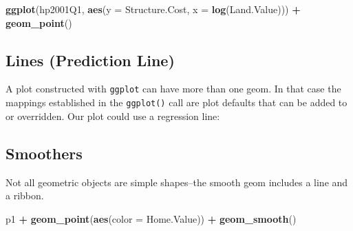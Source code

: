 \documentclass[]{book}
\newenvironment{Shaded}{\begin{snugshade}}{\end{snugshade}}
\newcommand{\KeywordTok}[1]{\textcolor[rgb]{0.13,0.29,0.53}{\textbf{#1}}}
\newcommand{\DataTypeTok}[1]{\textcolor[rgb]{0.13,0.29,0.53}{#1}}
\newcommand{\StringTok}[1]{\textcolor[rgb]{0.31,0.60,0.02}{#1}}
\newcommand{\OperatorTok}[1]{\textcolor[rgb]{0.81,0.36,0.00}{\textbf{#1}}}
\newcommand{\NormalTok}[1]{#1}
\begin{document}
\begin{Shaded}
\begin{Highlighting}[]
\KeywordTok{ggplot}\NormalTok{(hp2001Q1,}
       \KeywordTok{aes}\NormalTok{(}\DataTypeTok{y =}\NormalTok{ Structure.Cost, }\DataTypeTok{x =} \KeywordTok{log}\NormalTok{(Land.Value))) }\OperatorTok{+}
\StringTok{  }\KeywordTok{geom_point}\NormalTok{()}
\end{Highlighting}
\end{Shaded}

\subsection{Lines (Prediction Line)}\label{lines-prediction-line}

A plot constructed with \texttt{ggplot} can have more than one geom. In
that case the mappings established in the \texttt{ggplot()} call are
plot defaults that can be added to or overridden. Our plot could use a
regression line:

\begin{Shaded}
\end{Shaded}

\subsection{Smoothers}\label{smoothers}

Not all geometric objects are simple shapes--the smooth geom includes a
line and a ribbon.

\begin{Shaded}
\begin{Highlighting}[]
\NormalTok{p1 }\OperatorTok{+}
\StringTok{  }\KeywordTok{geom_point}\NormalTok{(}\KeywordTok{aes}\NormalTok{(}\DataTypeTok{color =}\NormalTok{ Home.Value)) }\OperatorTok{+}
\StringTok{  }\KeywordTok{geom_smooth}\NormalTok{()}
\end{Highlighting}
\end{Shaded}
\end{document}
